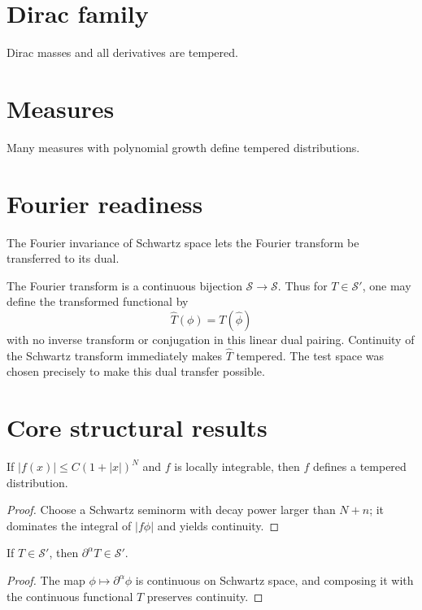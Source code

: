 \section{Dirac family}
Dirac masses and all derivatives are tempered.

\section{Measures}
Many measures with polynomial growth define tempered distributions.

\section{Fourier readiness}
The Fourier invariance of Schwartz space lets the Fourier transform be transferred to its dual.


\begin{example}\label{ex:iii18-expand-03}
The Fourier transform is a continuous bijection
\(\mathcal S\to\mathcal S\). Thus for \(T\in\mathcal S'\), one may define
the transformed functional by
\[
\widehat T(\phi)=T(\widehat\phi)
\]
with no inverse transform or conjugation in this linear dual pairing. Continuity of
the Schwartz transform immediately makes \(\widehat T\) tempered. The test
space was chosen precisely to make this dual transfer possible.
\end{example}
\section{Core structural results}

\begin{theorem}\label{thm:iii18-01}
If $|f(x)|\le C(1+|x|)^N$ and $f$ is locally integrable, then $f$ defines a tempered distribution.
\begin{proof}
Choose a Schwartz seminorm with decay power larger than $N+n$; it dominates the integral of $|f\phi|$ and yields continuity.
\end{proof}
\end{theorem}

\begin{theorem}\label{thm:iii18-02}
If $T\in\mathcal S'$, then $\partial^\alpha T\in\mathcal S'$.
\begin{proof}
The map $\phi\mapsto\partial^\alpha\phi$ is continuous on Schwartz space, and composing it with the continuous functional $T$ preserves continuity.
\end{proof}
\end{theorem}

